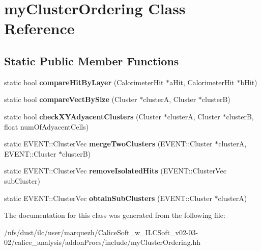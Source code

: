 \section{my\-Cluster\-Ordering Class Reference}
\label{classmyClusterOrdering}
\subsection*{Static Public Member Functions}
\begin{DoxyCompactItemize}
\item 
static bool {\bfseries compare\-Hit\-By\-Layer} (Calorimeter\-Hit $\ast$a\-Hit, Calorimeter\-Hit $\ast$b\-Hit)\label{classmyClusterOrdering_ac2904d36e505f78ed8c2f674228799eb}

\item 
static bool {\bfseries compare\-Vect\-By\-Size} (Cluster $\ast$cluster\-A, Cluster $\ast$cluster\-B)\label{classmyClusterOrdering_ad357e1d2c51a6cecd2f9419299b947dc}

\item 
static bool {\bfseries check\-X\-Y\-Adyacent\-Clusters} (Cluster $\ast$cluster\-A, Cluster $\ast$cluster\-B, float num\-Of\-Adyacent\-Cells)\label{classmyClusterOrdering_a6a73e211a8f1c576723b7e4357cd5f89}

\item 
static E\-V\-E\-N\-T\-::\-Cluster\-Vec {\bfseries merge\-Two\-Clusters} (E\-V\-E\-N\-T\-::\-Cluster $\ast$cluster\-A, E\-V\-E\-N\-T\-::\-Cluster $\ast$cluster\-B)\label{classmyClusterOrdering_a701c88add8e9a0e23f16dbe1bfbe9cf7}

\item 
static E\-V\-E\-N\-T\-::\-Cluster\-Vec {\bfseries remove\-Isolated\-Hits} (E\-V\-E\-N\-T\-::\-Cluster\-Vec sub\-Cluster)\label{classmyClusterOrdering_a6ca2324f45af090ad3ae381e712eda46}

\item 
static E\-V\-E\-N\-T\-::\-Cluster\-Vec {\bfseries obtain\-Sub\-Clusters} (E\-V\-E\-N\-T\-::\-Cluster $\ast$cluster\-A)\label{classmyClusterOrdering_a92fb99f4f6d0f278e57816aa800ec172}

\end{DoxyCompactItemize}


The documentation for this class was generated from the following file\-:\begin{DoxyCompactItemize}
\item 
/nfs/dust/ilc/user/marquezh/\-Calice\-Soft\-\_\-w\-\_\-\-I\-L\-C\-Soft\-\_\-v02-\/03-\/02/calice\-\_\-analysis/addon\-Procs/include/my\-Cluster\-Ordering.\-hh\end{DoxyCompactItemize}
